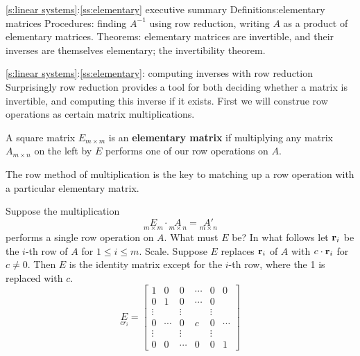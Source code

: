 \begin{frame}{\ref{s:linear systems}:\ref{ss:elementary} executive summary}\footnotesize
\alert{Definitions}:elementary matrices
\bspace
\alert{Procedures}: finding $A^{-1}$ using row reduction, writing $A$ as a product of elementary matrices.
\bspace
\alert{Theorems}: elementary matrices are invertible, and their inverses are themselves elementary; the invertibility theorem.\end{frame}
\begin{frame}{\ref{s:linear systems}:\ref{ss:elementary}: computing inverses with row reduction}
Surprisingly row reduction provides a tool for both deciding whether a matrix is invertible, and computing this inverse if it exists. 
\bpause 
First we will construe row operations as certain matrix multiplications. 
\begin{definition}
A square matrix $E_{m\times m}$ is an {\bf elementary matrix} if multiplying any matrix $A_{m\times n}$ on the left by $E$ performs one of our row operations on $A$. 
\end{definition}
\pause
\begin{comment}
Equivalently, a matrix $E_{m\times m}$ is elementary if it is the result of applying a single row operation on $I_m$. 
\end{comment}
\end{frame}
\begin{frame}
The \alert{row method} of multiplication is the key to matching up a row operation with a particular elementary matrix. 

Suppose the multiplication 
\[
\underset{m\times m}{E}\cdot\underset{m\times n}{A}=\underset{m\times n}{A'}
\]
performs a single row operation on $A$. What must $E$ be? In what follows let ${\mathbf r}_i$ be the $i$-th row of $A$ for $1\leq i\leq m$. 
\bspace
\alert{Scale.} Suppose $E$ replaces ${\mathbf r}_i$ of $A$ with $c\cdot{\mathbf r}_i$ for $c\ne 0$.  Then $E$ is the identity matrix except for the $i$-th row, where the 1 is replaced with $c$.  
\[
\underset{cr_i}{E}=\begin{bmatrix}
1&0&0&\cdots& 0&0\\
0&1&0&\cdots&0\\
\vdots& &\vdots & & \vdots \\
0&\cdots&0&c&0&\cdots\\
\vdots& &\vdots & & \vdots \\
0&0&\cdots&0&0&1
\end{bmatrix}
\]
\end{frame}
